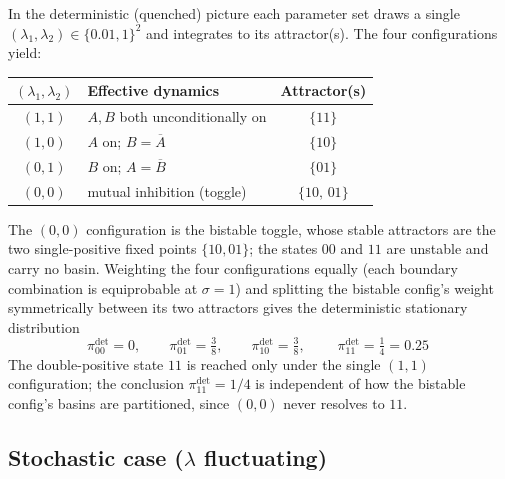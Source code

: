In the deterministic (quenched) picture each parameter set draws a single
$(\lambda_{1},\lambda_{2})\in\{0.01,1\}^2$ and integrates to its attractor(s).
The four configurations yield:
\begin{center}
\begin{tabular}{clc}
\toprule
$(\lambda_1,\lambda_2)$ & Effective dynamics & Attractor(s) \\
\midrule
$(1,1)$ & $A,B$ both unconditionally on & $\{11\}$ \\
$(1,0)$ & $A$ on; $B=\overline{A}$ & $\{10\}$ \\
$(0,1)$ & $B$ on; $A=\overline{B}$ & $\{01\}$ \\
$(0,0)$ & mutual inhibition (toggle) & $\{10,\,01\}$ \\
\bottomrule
\end{tabular}
\end{center}
The $(0,0)$ configuration is the bistable toggle, whose stable attractors are the
two single-positive fixed points $\{10,01\}$; the states $00$ and $11$ are
unstable and carry no basin. Weighting the four configurations equally (each
boundary combination is equiprobable at $\sigma=1$) and splitting the bistable
config's weight symmetrically between its two attractors gives the deterministic
stationary distribution
\begin{equation}
  \pi^{\det}_{00}=0,\qquad
  \pi^{\det}_{01}=\tfrac{3}{8},\qquad
  \pi^{\det}_{10}=\tfrac{3}{8},\qquad
  \boxed{\;\pi^{\det}_{11}=\tfrac{1}{4}=0.25\;}
  \label{eq:pidet}
\end{equation}
The double-positive state $11$ is reached only under the single $(1,1)$
configuration; the conclusion $\pi^{\det}_{11}=1/4$ is independent of how the
bistable config's basins are partitioned, since $(0,0)$ never resolves to $11$.
 
\subsection{Stochastic case ($\lambda$ fluctuating)}
\label{sec:annealed}
 
